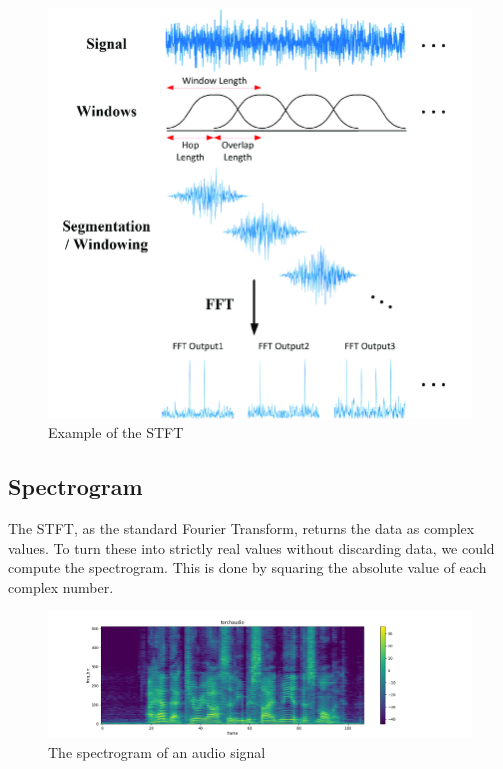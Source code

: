 \begin{figure}[H]
    \centering
    \includegraphics[scale=0.35]{figures/stft}
    \caption{Example of the \gls{STFT}}
    \label{STFTFigure}
\end{figure}

\subsection{Spectrogram}

The \gls{STFT}, as the standard Fourier Transform, returns the data as complex values. To turn these into strictly real values without discarding data, we could compute the spectrogram. This is done by squaring the absolute value of each complex number. 

\begin{figure}[H]
    \centering
    \includegraphics[scale=0.35]{figures/spectrogram}
    \caption{The spectrogram of an audio signal}
    \label{SpectrogramFigure}
\end{figure}

